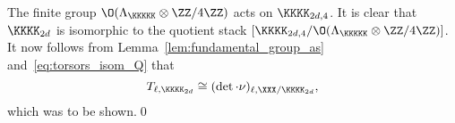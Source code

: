 The finite group $\O(\Lambda_{\KKKKK} \otimes \ZZ/4\ZZ)$ acts on $\KKKK_{2d,4}$. It is clear that $\KKKK_{2d}$ is isomorphic to the quotient stack $[\KKKK_{2d,4}/\O(\Lambda_{\KKKKK} \otimes \ZZ/4\ZZ)]$. It now follows from Lemma~\ref{lem:fundamental_group_as} and~\eqref{eq:torsors_isom_Q} that 
$$
T_{\ell,\KKKK_{2d}} \cong (\det\cdot\nu)_{\ell,\XXX/\KKKK_{2d}},
$$
which was to be shown.\qed

%

%
%
%
